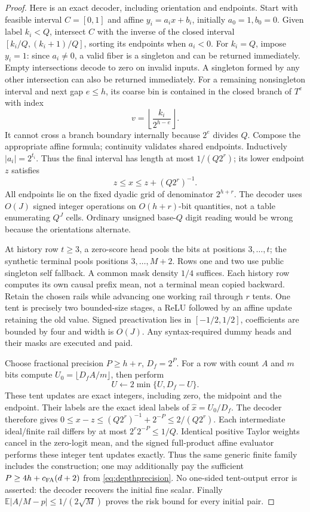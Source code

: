 \documentclass[11pt,letterpaper]{article}
\theoremstyle{definition}\newtheorem{definition}[theorem]{Definition}
\theoremstyle{remark}\newtheorem{remark}[theorem]{Remark}
\newcommand{\E}{\mathbb{E}}
\begin{document}
\begin{proof}
Here is an exact decoder, including orientation and endpoints. Start with feasible interval $C=[0,1]$ and affine $y_i=a_ix+b_i$, initially $a_0=1,b_0=0$. Given label $k_i< Q$, intersect $C$ with the inverse of the closed interval $[k_i/Q,(k_i+1)/Q]$, sorting its endpoints when $a_i<0$. For $k_i=Q$, impose $y_i=1$: since $a_i\ne0$, a valid fiber is a singleton and can be returned immediately. Empty intersections decode to zero on invalid inputs. A singleton formed by any other intersection can also be returned immediately. For a remaining nonsingleton interval and next gap $e\le h$, its coarse bin is contained in the closed branch of $T^e$ with index
\[
 v=\left\lfloor\frac{k_i}{2^{h-e}}\right\rfloor.
\]
It cannot cross a branch boundary internally because $2^e$ divides $Q$. Compose the appropriate affine formula; continuity validates shared endpoints. Inductively $|a_i|=2^{t_i}$. Thus the final interval has length at most $1/(Q2^r)$; its lower endpoint $z$ satisfies
\[
 z\le x\le z+(Q2^r)^{-1}.
\]
All endpoints lie on the fixed dyadic grid of denominator $2^{h+r}$. The decoder uses $O(J)$ signed integer operations on $O(h+r)$-bit quantities, not a table enumerating $Q^J$ cells. Ordinary unsigned base-$Q$ digit reading would be wrong because the orientations alternate.

At history row $t\ge3$, a zero-score head pools the bits at positions $3,\ldots,t$; the synthetic terminal pools positions $3,\ldots,M+2$. Rows one and two use public singleton self fallback. A common mask density $1/4$ suffices. Each history row computes its own causal prefix mean, not a terminal mean copied backward. Retain the chosen rails while advancing one working rail through $r$ tents. One tent is precisely two bounded-size stages, a ReLU followed by an affine update retaining the old value. Signed preactivation lies in $[-1/2,1/2]$, coefficients are bounded by four and width is $O(J)$. Any syntax-required dummy heads and their masks are executed and paid.

Choose fractional precision $P\ge h+r$, $D_f=2^P$. For a row with count $A$ and $m$ bits compute $U_0=\lfloor D_fA/m\rfloor$, then perform
\[
 U\longleftarrow2\min\{U,D_f-U\}.
\]
These tent updates are exact integers, including zero, the midpoint and the endpoint. Their labels are the exact ideal labels of $\widehat x=U_0/D_f$. The decoder therefore gives
$0\le x-z\le(Q2^r)^{-1}+2^{-P}\le2/(Q2^r)$.
Each intermediate ideal/finite rail differs by at most $2^r2^{-P}\le1/Q$. Identical positive Taylor weights cancel in the zero-logit mean, and the signed full-product affine evaluator performs these integer tent updates exactly. Thus the same generic finite family includes the construction; one may additionally pay the sufficient $P\ge4h+c_{\rm FA}(d+2)$ from \eqref{eq:depthprecision}. No one-sided tent-output error is asserted: the decoder recovers the initial fine scalar. Finally $\E|A/M-p|\le1/(2\sqrt M)$ proves the risk bound for every initial pair.
\end{proof}
\end{document}
